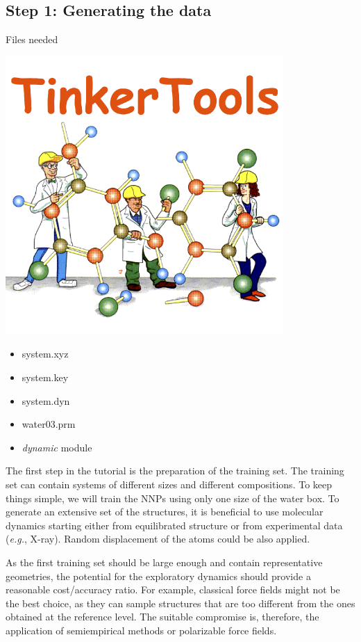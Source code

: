 \documentclass[12pt]{article}
\begin{document}
\subsection{Step 1: Generating the data}
\begin{mybox2}{{Files needed}}
\begin{minipage}[c]{0.5\linewidth}
\includegraphics[scale=0.2]{tinker.png}
\end{minipage}
\begin{minipage}[c]{0.5\linewidth}
\begin{itemize}
    \item system.xyz
    \item system.key
    \item system.dyn
    \item water03.prm
    \item \textit{dynamic} module
\end{itemize}
\end{minipage}
\end{mybox2}

The first step in the tutorial is the preparation of the training set. The training set can contain systems of different sizes and different compositions. To keep things simple, we will train the NNPs using only one size of the water box. To generate an extensive set of the structures, it is beneficial to use molecular dynamics starting either from equilibrated structure or from experimental data (\textit{e.g.}, X-ray). Random displacement of the atoms could be also applied.

As the first training set should be large enough and contain representative geometries, the potential for the exploratory dynamics should provide a reasonable cost/accuracy ratio. For example, classical force fields might not be the best choice, as they can sample structures that are too different from the ones obtained at the reference level. The suitable compromise is, therefore, the application of semiempirical methods or polarizable force fields.
\end{document}
